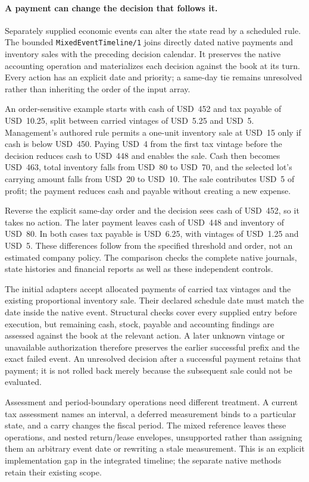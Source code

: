 \paragraph{A payment can change the decision that follows it.}
Separately supplied economic events can alter the state read by a scheduled
rule. The bounded \texttt{MixedEventTimeline/1} joins directly dated native
payments and inventory sales with the preceding decision calendar. It preserves
the native accounting operation and materializes each decision against the book
at its turn. Every action has an explicit date and priority; a same-day tie
remains unresolved rather than inheriting the order of the input array.

An order-sensitive example starts with cash of USD~452 and tax payable of
USD~10.25, split between carried vintages of USD~5.25 and USD~5. Management's
authored rule permits a one-unit inventory sale at USD~15 only if cash is below
USD~450. Paying USD~4 from the first tax vintage before the decision reduces
cash to USD~448 and enables the sale. Cash then becomes USD~463, total inventory
falls from USD~80 to USD~70, and the selected lot's carrying amount falls from
USD~20 to USD~10. The sale contributes USD~5 of profit; the payment reduces cash
and payable without creating a new expense.

Reverse the explicit same-day order and the decision sees cash of USD~452,
so it takes no action. The later payment leaves cash of USD~448 and inventory
of USD~80. In both cases tax payable is USD~6.25, with vintages of USD~1.25 and
USD~5. These differences follow from the specified threshold and order, not an
estimated company policy. The comparison checks the complete native journals,
state histories and financial reports as well as these independent controls.

The initial adapters accept allocated payments of carried tax vintages and the
existing proportional inventory sale. Their declared schedule date must match
the date inside the native event. Structural checks cover every supplied entry
before execution, but remaining cash, stock, payable and accounting findings
are assessed against the book at the relevant action. A later unknown vintage
or unavailable authorization therefore preserves the earlier successful prefix
and the exact failed event. An unresolved decision after a successful payment
retains that payment; it is not rolled back merely because the subsequent sale
could not be evaluated.

Assessment and period-boundary operations need different treatment. A current
tax assessment names an interval, a deferred measurement binds to a particular
state, and a carry changes the fiscal period. The mixed reference leaves these
operations, and nested return/lease envelopes, unsupported rather than assigning
them an arbitrary event date or rewriting a stale measurement. This is an
explicit implementation gap in the integrated timeline; the separate native
methods retain their existing scope.


